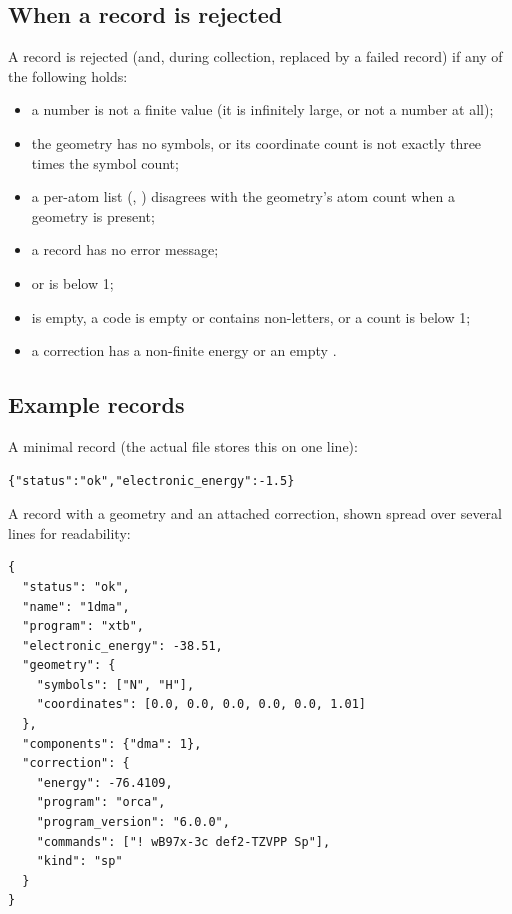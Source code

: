 \subsection{When a record is rejected}

A record is rejected (and, during collection, replaced by a failed record) if
any of the following holds:

\begin{itemize}
  \item a number is not a finite value (it is infinitely large, or not a
        number at all);
  \item the geometry has no symbols, or its coordinate count is not exactly
        three times the symbol count;
  \item a per-atom list (, ) disagrees
        with the geometry's atom count when a geometry is present;
  \item a  record has no error message;
  \item {} or  is below 1;
  \item {} is empty, a code is empty or contains non-letters, or
        a count is below 1;
  \item a correction has a non-finite energy or an empty .
\end{itemize}

\subsection{Example records}

A minimal record (the actual file stores this on one line):

\begin{verbatim}
{"status":"ok","electronic_energy":-1.5}
\end{verbatim}

A record with a geometry and an attached correction, shown spread over several
lines for readability:

\begin{verbatim}
{
  "status": "ok",
  "name": "1dma",
  "program": "xtb",
  "electronic_energy": -38.51,
  "geometry": {
    "symbols": ["N", "H"],
    "coordinates": [0.0, 0.0, 0.0, 0.0, 0.0, 1.01]
  },
  "components": {"dma": 1},
  "correction": {
    "energy": -76.4109,
    "program": "orca",
    "program_version": "6.0.0",
    "commands": ["! wB97x-3c def2-TZVPP Sp"],
    "kind": "sp"
  }
}
\end{verbatim}
